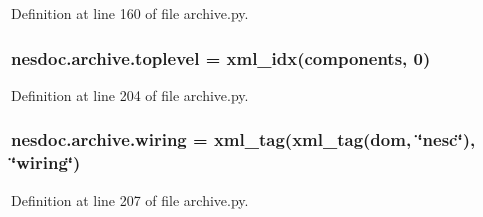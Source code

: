 Definition at line 160 of file archive.\+py.

\subsubsection[{\texorpdfstring{toplevel}{toplevel}}]{\setlength{\rightskip}{0pt plus 5cm}nesdoc.\+archive.\+toplevel = xml\+\_\+idx({\bf components}, 0)}\hypertarget{namespacenesdoc_1_1archive_af8d43aad68a2aa804f3cdb3fd916d6f4}{}\label{namespacenesdoc_1_1archive_af8d43aad68a2aa804f3cdb3fd916d6f4}


Definition at line 204 of file archive.\+py.

\subsubsection[{\texorpdfstring{wiring}{wiring}}]{\setlength{\rightskip}{0pt plus 5cm}nesdoc.\+archive.\+wiring = xml\+\_\+tag(xml\+\_\+tag({\bf dom}, \char`\"{}nesc\char`\"{}), \char`\"{}wiring\char`\"{})}\hypertarget{namespacenesdoc_1_1archive_a1160552e7edb290ebe1d5d0341df787a}{}\label{namespacenesdoc_1_1archive_a1160552e7edb290ebe1d5d0341df787a}


Definition at line 207 of file archive.\+py.

